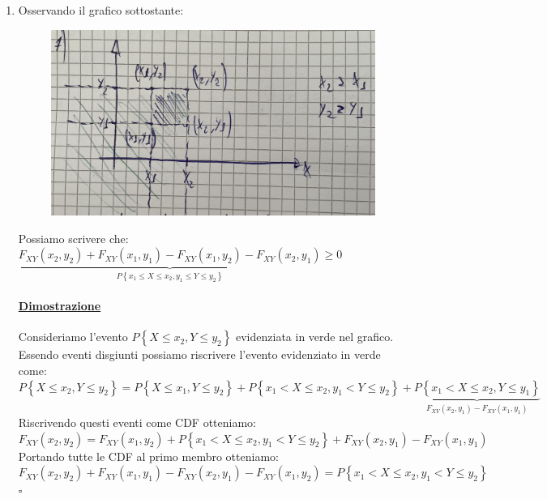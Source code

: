 \documentclass{article}
\begin{document}
\begin{enumerate}
\begin{figure}[ht]
    \end{figure} 
    \item Osservando il grafico sottostante:
    \begin{figure}[ht]
    \centering
    \includegraphics[scale=0.12]{images/73.Prop7CDFVettA.jpeg}
    \end{figure} 
    Possiamo scrivere che: \\
    $\underset{P\left\{x_1 \leq X \leq x_2, y_1 \leq Y \leq y_2\right\}}{\underbrace{F_{XY}(x_2,y_2) + F_{XY}(x_1,y_1) - F_{XY}(x_1,y_2) - F_{XY}(x_2,y_1)}} \geq 0$
    \paragraph{\underline{Dimostrazione}}
    Consideriamo l’evento $P \left\{X \leq x_2, Y \leq y_2 \right\}$ evidenziata in verde nel grafico. \\
    Essendo eventi disgiunti possiamo riscrivere l’evento evidenziato in verde come: \\
    $P\left\{X \leq x_2 , Y \leq y_2 \right\} = P\left\{X \leq x_1 , Y \leq y_2 \right\} + P\left\{x_1 < X \leq x_2, y_1 < Y \leq y_2 \right\} + \underset{F_{XY}(x_2,y_1) - F_{XY}(x_1,y_1)}{\underbrace{P\left\{x_1 < X \leq x_2, Y \leq y_1\right\}}}$ \\
    Riscrivendo questi eventi come CDF otteniamo: \\
    $F_{XY}(x_2,y_2) = F_{XY}(x_1,y_2) + P\left\{x_1 < X \leq x_2, y_1 < Y \leq y_2 \right\} + F_{XY}(x_2,y_1) - F_{XY}(x_1,y_1)$ \\
    Portando tutte le CDF al primo membro otteniamo: \\
    $F_{XY}(x_2,y_2) + F_{XY}(x_1,y_1) - F_{XY}(x_2,y_1) - F_{XY}(x_1,y_2) = P\left\{x_1 < X \leq x_2, y_1 < Y \leq y_2 \right\} $ \\
    \hspace*{0pt}\hfill $\square$ 
\end{enumerate}
\end{document}

